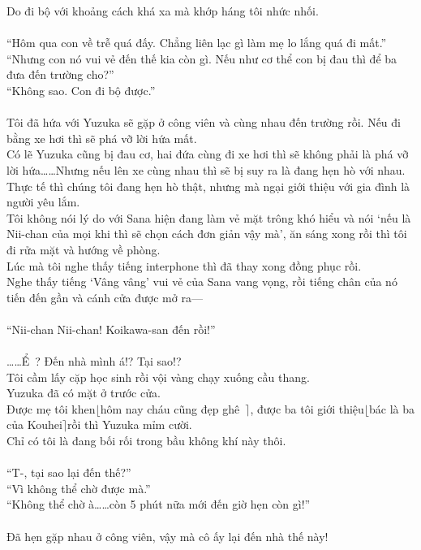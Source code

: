 \documentclass[12pt,a4paper, twosides]{book}
\begin{document}
Do đi bộ với khoảng cách khá xa mà khớp háng tôi nhức nhối.\\
\\
“Hôm qua con về trễ quá đấy. Chẳng liên lạc gì làm mẹ lo lắng quá đi mất.”\\
“Nhưng con nó vui vẻ đến thế kia còn gì. Nếu như cơ thể con bị đau thì để ba đưa đến trường cho?”\\
“Không sao. Con đi bộ được.”\\
\\
Tôi đã hứa với Yuzuka sẽ gặp ở công viên và cùng nhau đến trường rồi. Nếu đi bằng xe hơi thì sẽ phá vỡ lời hứa mất.\\
Có lẽ Yuzuka cũng bị đau cơ, hai đứa cùng đi xe hơi thì sẽ không phải là phá vỡ lời hứa……Nhưng nếu lên xe cùng nhau thì sẽ bị suy ra là đang hẹn hò với nhau. Thực tế thì chúng tôi đang hẹn hò thật, nhưng mà ngại giới thiệu với gia đình là người yêu lắm.\\
Tôi không nói lý do với Sana hiện đang làm vẻ mặt trông khó hiểu và nói ‘nếu là Nii-chan của mọi khi thì sẽ chọn cách đơn giản vậy mà’, ăn sáng xong rồi thì tôi đi rửa mặt và hướng về phòng.\\
Lúc mà tôi nghe thấy tiếng interphone thì đã thay xong đồng phục rồi.\\
Nghe thấy tiếng ‘Vâng vâng’ vui vẻ của Sana vang vọng, rồi tiếng chân của nó tiến đến gần và cánh cửa được mở ra—\\
\\
“Nii-chan Nii-chan! Koikawa-san đến rồi!”\\
\\
……Ể~? Đến nhà mình á!? Tại sao!?\\
Tôi cầm lấy cặp học sinh rồi vội vàng chạy xuống cầu thang.\\
Yuzuka đã có mặt ở trước cửa.\\
Được mẹ tôi khen$\lfloor$hôm nay cháu cũng đẹp ghê~$\rceil$, được ba tôi giới thiệu$\lfloor$bác là ba của Kouhei$\rceil$rồi thì Yuzuka mỉm cười.\\
Chỉ có tôi là đang bối rối trong bầu không khí này thôi.\\
\\
“T-, tại sao lại đến thế?”\\
“Vì không thể chờ được mà.”\\
“Không thể chờ à……còn 5 phút nữa mới đến giờ hẹn còn gì!”\\
\\
Đã hẹn gặp nhau ở công viên, vậy mà cô ấy lại đến nhà thế này!\\
\end{document}
